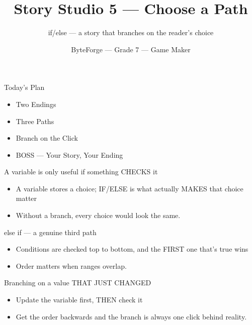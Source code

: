 \documentclass[aspectratio=169]{beamer}
\title{Story Studio 5 — Choose a Path}
\subtitle{if/else — a story that branches on the reader's choice}
\author{ByteForge --- Grade 7 --- Game Maker}
\date{}
\begin{document}
\begin{frame}
    \titlepage
\end{frame}

\begin{frame}{Today's Plan}
    \begin{itemize}
        \item Two Endings
        \item Three Paths
        \item Branch on the Click
        \item[$\bigstar$] BOSS --- Your Story, Your Ending
    \end{itemize}
\end{frame}

\begin{frame}{A variable is only useful if something CHECKS it}
    \large
    \begin{itemize}
        \item A variable stores a choice; IF/ELSE is what actually MAKES that choice matter
        \item Without a branch, every choice would look the same.
    \end{itemize}

    \begin{center}
    \end{center}
\end{frame}


\begin{frame}{else if — a genuine third path}
    \large
    \begin{itemize}
        \item Conditions are checked top to bottom, and the FIRST one that's true wins
        \item Order matters when ranges overlap.
    \end{itemize}
\end{frame}


\begin{frame}{Branching on a value THAT JUST CHANGED}
    \large
    \begin{itemize}
        \item Update the variable first, THEN check it
        \item Get the order backwards and the branch is always one click behind reality.
    \end{itemize}
\end{frame}
\end{document}
